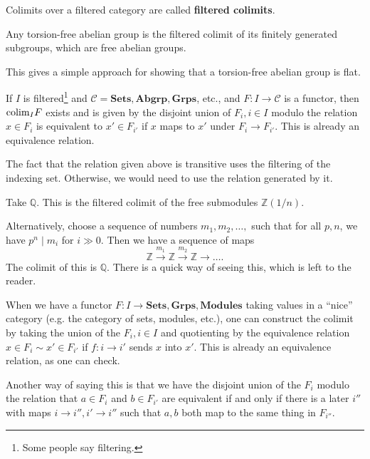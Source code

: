 \begin{proposition}
\begin{definition}
Colimits over a filtered category are called \textbf{filtered colimits}.
\end{definition}

\begin{example}
Any torsion-free abelian group is the filtered colimit of its finitely
generated subgroups, which are free abelian groups.
\end{example}
This gives a simple approach for showing that a torsion-free abelian group is
flat.

\begin{proposition}
If $I$ is filtered\footnote{Some people say filtering.} and $\mathcal{C} =
\mathbf{Sets}, \mathbf{Abgrp}, \mathbf{Grps}$, etc., and $F: I \to \mathcal{C}$
is a functor, then $\mathrm{colim}_I F$ exists and is given by the disjoint union of
$F_i, i \in I$ modulo the relation $x \in F_i$ is equivalent to $x' \in F_{i'}$
if $x$ maps to $x'$ under $F_i \to F_{i'}$. This is already an equivalence
relation.
\end{proposition}

The fact that the relation given above is transitive uses the filtering of the
indexing set. Otherwise, we would need to use the relation generated by it.

\begin{example}
Take $\mathbb{Q}$. This is the filtered colimit of the free submodules
$\mathbb{Z}(1/n)$.

Alternatively, choose a sequence of numbers $m_1 , m_2, \dots, $ such that for
all $p, n$, we have $p^n \mid m_i$ for $i \gg 0$. Then we have a sequence of
maps
\[ \mathbb{Z} \stackrel{m_1}{\to} \mathbb{Z} \stackrel{m_2}{\to}\mathbb{Z}
\to \dots.   \]
The colimit of this is $\mathbb{Q}$. There is a quick way of seeing this, which
is left to the reader.
\end{example}

When we have a functor $F: I \to \mathbf{Sets}, \mathbf{Grps},
\mathbf{Modules}$ taking values in a ``nice'' category (e.g. the category of
sets, modules, etc.), one can construct the colimit by taking the union of the
$F_i, i \in I$ and quotienting by the equivalence relation $x \in F_i \sim x'
\in F_{i'}$ if $f: i \to i'$ sends $x$ into $x'$. This is already an
equivalence relation, as one can check.

Another way of saying this is that we have the disjoint union of the $F_i$
modulo the relation that $a \in F_i$ and $b \in F_{i'}$ are equivalent if and
only if there is a later $i''$ with maps $i \to i'', i' \to i''$ such that
$a,b$ both map to the same thing in $F_{i''}$.



\end{proposition}
